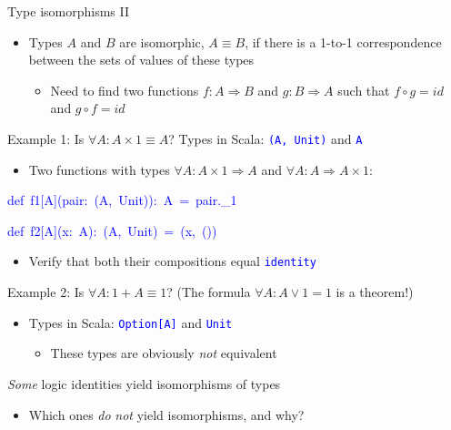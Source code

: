 \documentclass[english]{beamer}
\newenvironment{lyxcode}
   {\par\begin{list}{}{
     \setlength{\rightmargin}{\leftmargin}
     \setlength{\listparindent}{0pt}%
     \raggedright
     \setlength{\itemsep}{0pt}
     \setlength{\parsep}{0pt}
     \normalfont\ttfamily}%
    \def\{{\char`\{}
    \def\}{\char`\}}
    \def\textasciitilde{\char`\~}
    \item[]}
   {\end{list}}
\begin{document}
\begin{frame}{Type isomorphisms II}

\begin{itemize}
\item Types $A$ and $B$ are isomorphic, $A\equiv B$, if there is a 1-to-1
correspondence between the sets of values of these types
\begin{itemize}
\item Need to find two functions $f:A\Rightarrow B$ and $g:B\Rightarrow A$
such that $f\circ g=id$ and $g\circ f=id$
\end{itemize}
\end{itemize}
Example 1: Is $\forall A:A\times1\equiv A$? Types in Scala: \texttt{\textcolor{blue}{\footnotesize{}(A,
Unit)}} and \texttt{\textcolor{blue}{\footnotesize{}A}}{\footnotesize \par}
\begin{itemize}
\item Two functions with types $\forall A:A\times1\Rightarrow A$ and $\forall A:A\Rightarrow A\times1$:
\end{itemize}
\begin{lyxcode}
\textcolor{blue}{\footnotesize{}def~f1{[}A{]}(pair:~(A,~Unit)):~A~=~pair.\_1}{\footnotesize \par}

\textcolor{blue}{\footnotesize{}def~f2{[}A{]}(x:~A):~(A,~Unit)~=~(x,~())}{\footnotesize \par}
\end{lyxcode}
\begin{itemize}
\item Verify that both their compositions equal \texttt{\textcolor{blue}{\footnotesize{}identity}} 
\end{itemize}
Example 2: Is $\forall A:1+A\equiv1$? (The formula $\forall A:A\vee1=1$
is a theorem!)
\begin{itemize}
\item Types in Scala: \texttt{\textcolor{blue}{\footnotesize{}Option{[}A{]}}}
and \texttt{\textcolor{blue}{\footnotesize{}Unit}} 
\begin{itemize}
\item These types are obviously \emph{not} equivalent
\end{itemize}
\end{itemize}
\emph{Some} logic identities yield\emph{ }isomorphisms of types
\begin{itemize}
\item Which ones \emph{do} \emph{not} yield isomorphisms, and why?
\end{itemize}
\end{frame}
\end{document}
